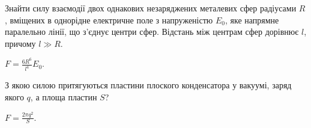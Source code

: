 \begin{problem}%
Знайти силу взаємодії двох однакових незаряджених металевих сфер радіусами $R$, вміщених в однорідне електричне поле з напруженістю $E_0$, яке напрямне паралельно лінії, що з'єднує центри сфер. Відстань між центрам сфер дорівнює $l$, причому $l \gg R$.
\begin{solution}
	$F = \frac{6R^6}{l^4} E_0$.
\end{solution}
\end{problem}

\begin{problem}
З якою силою притягуються пластини плоского конденсатора у вакуумі, заряд якого $q$, а площа пластин $S$?
\begin{solution}
	$F = \frac{2\pi q^2}{S}$.
\end{solution}
\end{problem}


